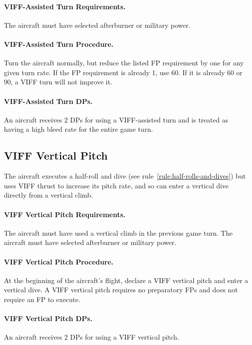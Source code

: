 \begin{advancedrules}
{\paragraph{VIFF-Assisted Turn Requirements.} The aircraft must have selected afterburner or military power.

\paragraph{VIFF-Assisted Turn Procedure.} Turn the aircraft normally, but reduce the listed FP requirement by one for any given turn rate. If the FP requirement is already 1, use 60{\deg}. If it is already 60{\deg} or 90{\deg}, a VIFF turn will not improve it.

\paragraph{VIFF-Assisted Turn DPs.} An aircraft receives 2 DPs for using a VIFF-assisted turn and is treated as having a high bleed rate for the entire game turn.

\subsection{VIFF Vertical Pitch}
\label{rule:viff-vertical-pitch}

The aircraft executes a half-roll and dive (see rule~\ref{rule:half-rolls-and-dives}) but uses VIFF thrust to increase its pitch rate, and so can enter a vertical dive directly from a vertical climb.

\paragraph{VIFF Vertical Pitch Requirements.} The aircraft must have used a vertical climb in the previous game turn. The aircraft must have selected afterburner or military power.

\paragraph{VIFF Vertical Pitch Procedure.} At the beginning of the aircraft's flight, declare a VIFF vertical pitch and enter a vertical dive. A VIFF vertical pitch requires no preparatory FPs and does not require an FP to execute.

\paragraph{VIFF Vertical Pitch DPs.} An aircraft receives 2 DPs for using a VIFF vertical pitch.

}
\end{advancedrules}
